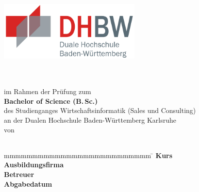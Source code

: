 \thispagestyle{plain}

\begin{titlepage}

        \centering\includegraphics[height=3cm]{Abbildungen/dhbw}	
    \enlargethispage{20mm}
	
	\begin{center}
		  \vspace*{12mm}	{\LARGE\bf \titel }\\
		  \vspace*{12mm}	{\large\bf \art}\\
		  \vspace*{12mm}	im Rahmen der Prüfung zum\\
		  \vspace*{3mm} 	\textbf{Bachelor of Science (B.\,Sc.)}\\
		  \vspace*{12mm}	des Studienganges Wirtschaftsinformatik (Sales und Consulting)\\
		  \vspace*{3mm} 	an der Dualen Hochschule Baden-Württemberg Karlsruhe\\
		  \vspace*{12mm}	von\\
		  \vspace*{3mm} 	{\large\bf \verfasser}\\

		\end{center}
		\vfill
		\begin{spacing}{1.2}
			\begin{tabbing}
				mmmmmmmmmmmmmmmmmmmmmmmmmm     \= \kill
				\textbf{Kurs}  				   \>  \kurs\\
				\textbf{Ausbildungsfirma}      \>  \ausbildungsbetrieb\\
				\textbf{Betreuer}              \>  \betreuer\\
				\textbf{Abgabedatum}		   \> \underline{\hspace{4cm}}

			\end{tabbing}
		\end{spacing}
\end{titlepage}